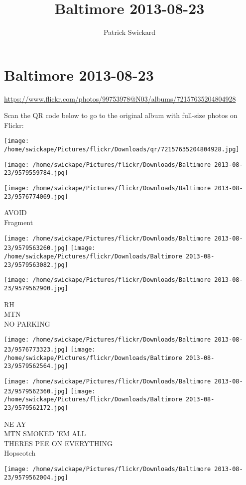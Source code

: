 \documentclass[10pt,letterpaper]{article}
\title{Baltimore 2013-08-23}
\author{Patrick Swickard}
\date{}
\begin{document}
\section*{Baltimore 2013-08-23}

\url{https://www.flickr.com/photos/99753978@N03/albums/72157635204804928}

Scan the QR code below to go to the original album with full-size photos on Flickr:

\texttt{[image: /home/swickape/Pictures/flickr/Downloads/qr/72157635204804928.jpg]}
\pagebreak

\texttt{[image: /home/swickape/Pictures/flickr/Downloads/Baltimore 2013-08-23/9579559784.jpg]}

\vspace{0.25in}
\texttt{[image: /home/swickape/Pictures/flickr/Downloads/Baltimore 2013-08-23/9576774069.jpg]}

AVOID\\
Fragment
\pagebreak

\texttt{[image: /home/swickape/Pictures/flickr/Downloads/Baltimore 2013-08-23/9579563260.jpg]}
\texttt{[image: /home/swickape/Pictures/flickr/Downloads/Baltimore 2013-08-23/9579563082.jpg]}

\vspace{0.25in}
\texttt{[image: /home/swickape/Pictures/flickr/Downloads/Baltimore 2013-08-23/9579562900.jpg]}

RH\\
MTN\\
NO PARKING
\pagebreak

\texttt{[image: /home/swickape/Pictures/flickr/Downloads/Baltimore 2013-08-23/9576773323.jpg]}
\texttt{[image: /home/swickape/Pictures/flickr/Downloads/Baltimore 2013-08-23/9579562564.jpg]}

\texttt{[image: /home/swickape/Pictures/flickr/Downloads/Baltimore 2013-08-23/9579562360.jpg]}
\texttt{[image: /home/swickape/Pictures/flickr/Downloads/Baltimore 2013-08-23/9579562172.jpg]}

NE AY\\
MTN SMOKED 'EM ALL\\
THERES PEE ON EVERYTHING\\
Hopscotch
\pagebreak

\texttt{[image: /home/swickape/Pictures/flickr/Downloads/Baltimore 2013-08-23/9579562004.jpg]}
\end{document}
